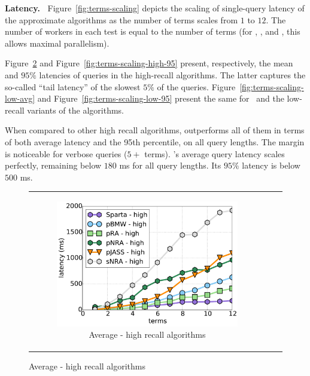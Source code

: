 {{{\bf Latency.\ } 
Figure~\ref{fig:terms-scaling} depicts the scaling of single-query latency of the approximate algorithms  
as the number of terms scales from $1$ to $12$. The number of workers in each test 
is equal to the number of terms (for \alg, \pRA, and \pNRA, this allows maximal parallelism). 

Figure~\ref{fig:terms-scaling-high-avg} and Figure~\ref{fig:terms-scaling-high-95} present, respectively, the  mean and  
$95\%$ latencies of queries in the high-recall algorithms. The latter captures the so-called ``tail latency'' of 
the slowest $5\%$ of the queries. Figure~\ref{fig:terms-scaling-low-avg} and Figure~\ref{fig:terms-scaling-low-95} present the same for \alg\hi\ and the low-recall variants of the algorithms.

%
When compared to other high recall algorithms, \alg\/ outperforms all of them in terms of both average latency and the 95th percentile, on all query lengths.
The margin is noticeable for verbose queries
($5+$ terms). \alg's average query latency scales perfectly, 
remaining below $180$ ms for all query lengths.
Its  $95\%$ latency is below $500$ ms. 


\begin{figure}[tbh]
\centering
\begin{tabular}{ccc}
      \begin{subfigure}[t]{0.4\textwidth}
         \includegraphics[width=\textwidth]{figures/latency_12threads_clueweb.pdf}
        \caption[]{Average\bigdataset{, \cw} - high recall algorithms}
        \label{fig:terms-scaling-high-avg}
      \end{subfigure}     


\end{tabular}
\end{figure}}}
